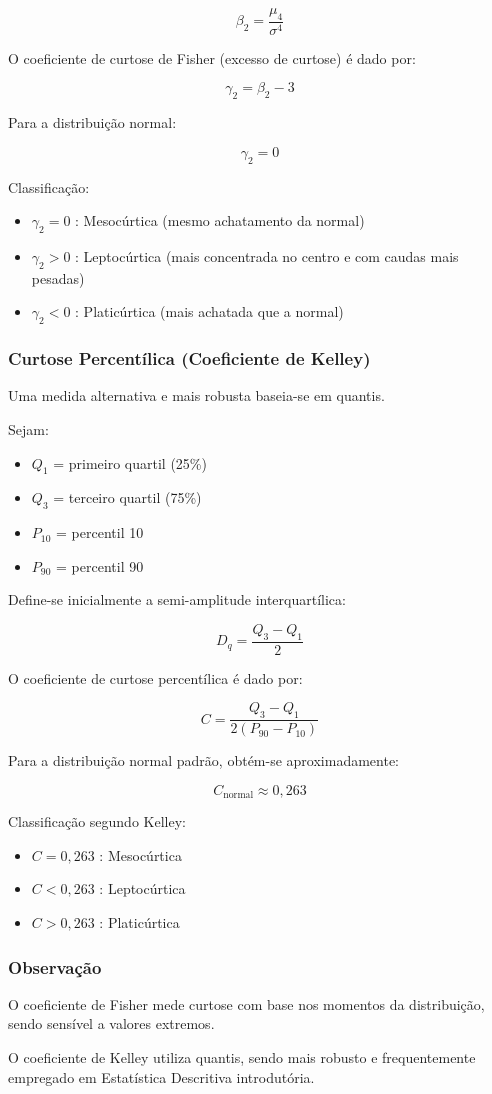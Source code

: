 \[
\beta_2 = \frac{\mu_4}{\sigma^4}
\]

O coeficiente de curtose de Fisher (excesso de curtose) é dado por:

\[
\gamma_2 = \beta_2 - 3
\]

Para a distribuição normal:

\[
\gamma_2 = 0
\]

Classificação:

\begin{itemize}
    \item $\gamma_2 = 0$ : Mesocúrtica (mesmo achatamento da normal)
    \item $\gamma_2 > 0$ : Leptocúrtica (mais concentrada no centro e com caudas mais pesadas)
    \item $\gamma_2 < 0$ : Platicúrtica (mais achatada que a normal)
\end{itemize}

\subsubsection{Curtose Percentílica (Coeficiente de Kelley)}

Uma medida alternativa e mais robusta baseia-se em quantis.

Sejam:

\begin{itemize}
    \item $Q_1$ = primeiro quartil (25\%)
    \item $Q_3$ = terceiro quartil (75\%)
    \item $P_{10}$ = percentil 10
    \item $P_{90}$ = percentil 90
\end{itemize}

Define-se inicialmente a semi-amplitude interquartílica:

\[
D_q = \frac{Q_3 - Q_1}{2}
\]

O coeficiente de curtose percentílica é dado por:

\[
C = \frac{Q_3 - Q_1}{2(P_{90} - P_{10})}
\]

Para a distribuição normal padrão, obtém-se aproximadamente:

\[
C_{\text{normal}} \approx 0,263
\]

Classificação segundo Kelley:

\begin{itemize}
    \item $C = 0{,}263$ : Mesocúrtica
    \item $C < 0{,}263$ : Leptocúrtica
    \item $C > 0{,}263$ : Platicúrtica
\end{itemize}

\subsubsection{Observação}

O coeficiente de Fisher mede curtose com base nos momentos da distribuição, sendo sensível a valores extremos.

O coeficiente de Kelley utiliza quantis, sendo mais robusto e frequentemente empregado em Estatística Descritiva introdutória.